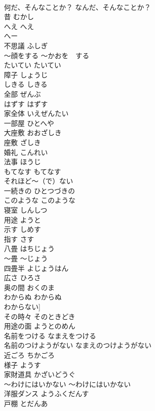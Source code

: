 \documentclass[8pt]{extreport}
\begin{document}
\begin{CJK}{UTF8}{min}
\\	何だ、そんなことか？	なんだ、そんなことか？	
\\	昔	むかし	
\\	へえ	へえ 
\\	へー	
\\	不思議	ふしぎ	
\\	〜顔をする	〜かおを　する	
\\	たいてい	たいてい	
\\	障子	しょうじ	
\\	しきる	しきる	
\\	全部	ぜんぶ	
\\	はずす	はずす	
\\	家全体	いえぜんたい	
\\	一部屋	ひとへや	
\\	大座敷	おおざしき	
\\	座敷	ざしき	
\\	婚礼	こんれい	
\\	法事	ほうじ	
\\	もてなす	もてなす	
\\	それほど〜（で）ない	
\\	一続きの	ひとつづきの	
\\	このような	このような	
\\	寝室	しんしつ	
\\	用途	ようと	
\\	示す	しめす	
\\	指す	さす	
\\	八畳	はちじょう	
\\	〜畳	〜じょう	
\\	四畳半	よじょうはん	
\\	広さ	ひろさ	
\\	奥の間	おくのま	
\\	わからぬ	わからぬ	
\\	わからない]
\\	その時々	そのときどき	
\\	用途の面	ようとのめん	
\\	名前をつける	なまえをつける	
\\	名前のつけようがない	なまえのつけようがない	
\\	近ごろ	ちかごろ	
\\	様子	ようす	
\\	家財道具	かざいどうぐ	
\\	〜わけにはいかない	〜わけにはいかない	
\\	洋服ダンス	ようふくだんす	
\\	戸棚	とだんあ	

\end{CJK}
\end{document}
